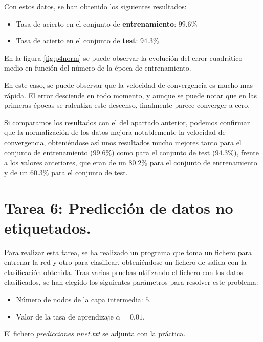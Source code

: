 \documentclass[spanish]{assignment}
\begin{document}
	Con estos datos, se han obtenido los siguientes resultados:
	\begin{itemize}
		\item Tasa de acierto en el conjunto de \textbf{entrenamiento}: $99.6\%$
		\item Tasa de acierto en el conjunto de \textbf{test}: $94.3\%$
	\end{itemize}
	
	
	En la figura \ref{fig:p4norm} se puede observar la evolución del error cuadrático medio en función del número de la época de entrenamiento. 
	
	En este caso, se puede observar que la velocidad de convergencia es mucho mas rápida. El error desciende en todo momento, y aunque se puede notar que en las primeras épocas se ralentiza este descenso, finalmente parece converger a cero. 
	
	Si comparamos los resultados con el del apartado anterior, podemos confirmar que la normalización de los datos mejora notablemente la velocidad de convergencia, obteniéndose así unos resultados mucho mejores tanto para el conjunto de entrenamiento ($99.6\%$) como para el conjunto de test ($94.3\%$), frente a los valores anteriores, que eran de un $80.2\%$ para el conjunto de entrenamiento y de un $60.3\%$ para el conjunto de test.
	
	\section{Tarea 6: Predicción de datos no etiquetados.}
	Para realizar esta tarea, se ha realizado un programa que toma un fichero para entrenar la red y otro para clasificar, obteniéndose un fichero de salida con la clasificación obtenida. 
	Tras varias pruebas utilizando el fichero con los datos clasificados, se han elegido los siguientes parámetros para resolver este problema:
	\begin{itemize}
		\item Número de nodos de la capa intermedia: $5$.
		\item Valor de la tasa de aprendizaje $\alpha = 0.01$.
	\end{itemize}
	El fichero \textit{predicciones$\_$nnet.txt} se adjunta con la práctica.
	
\end{document}
